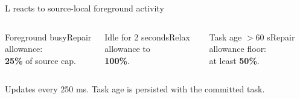 \begin{frame}{L reacts to source-local foreground activity}
\begin{columns}[T,onlytextwidth]
\begin{block}{Foreground busy}Repair allowance:\\ \textbf{25\%} of source cap.\end{block}
\begin{block}{Idle for 2 seconds}Relax allowance to\\ \textbf{100\%}.\end{block}
\begin{block}{Task age $>60$ s}Repair allowance floor:\\ at least \textbf{50\%}.\end{block}
\end{columns}
\vspace{5mm}
Updates every 250 ms. Task age is persisted with the committed task.
\end{frame}
